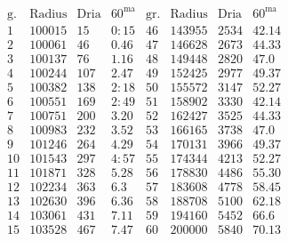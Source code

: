 \documentclass[11pt,a4paper]{article}
\begin{document}
\[
\begin{array}{r|r|r|r||r|r|r|r}
\text{g.} & \text{Radius} & \text{Dria} & 60^{\text{ma}} & \text{gr.} & \text{Radius} & \text{Dria} & 60^{\text{ma}} \\
\hline
1 & 100015 & 15 & 0{:}15 & 46 & 143955 & 2534 & 42.14 \\
2 & 100061 & 46 & 0.46 & 47 & 146628 & 2673 & 44.33 \\
3 & 100137 & 76 & 1.16 & 48 & 149448 & 2820 & 47.0 \\
4 & 100244 & 107 & 2.47 & 49 & 152425 & 2977 & 49.37 \\
5 & 100382 & 138 & 2{:}18 & 50 & 155572 & 3147 & 52.27 \\
\hline
6 & 100551 & 169 & 2{:}49 & 51 & 158902 & 3330 & 42.14 \\
7 & 100751 & 200 & 3.20 & 52 & 162427 & 3525 & 44.33 \\
8 & 100983 & 232 & 3.52 & 53 & 166165 & 3738 & 47.0 \\
9 & 101246 & 264 & 4.29 & 54 & 170131 & 3966 & 49.37 \\
10 & 101543 & 297 & 4{:}57 & 55 & 174344 & 4213 & 52.27 \\
\hline
11 & 101871 & 328 & 5.28 & 56 & 178830 & 4486 & 55.30 \\
12 & 102234 & 363 & 6.3 & 57 & 183608 & 4778 & 58.45 \\
13 & 102630 & 396 & 6.36 & 58 & 188708 & 5100 & 62.18 \\
14 & 103061 & 431 & 7.11 & 59 & 194160 & 5452 & 66.6 \\
15 & 103528 & 467 & 7.47 & 60 & 200000 & 5840 & 70.13 \\
\end{array}
\]
\end{document}
